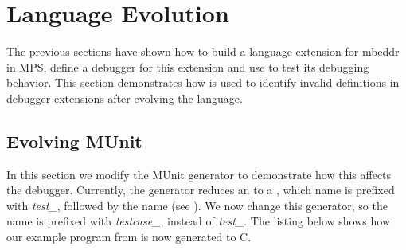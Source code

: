 \section{Language Evolution}

The previous sections have shown how to build a language extension for mbeddr in
\ac{MPS}, define a debugger for this extension and use  to test its
debugging behavior.
This section demonstrates how  is used to identify invalid definitions
in debugger extensions after evolving the language.

\subsection{Evolving MUnit}

In this section we modify the MUnit generator to demonstrate how this affects
the debugger. Currently, the generator reduces an  to a
, which name is prefixed with \emph{test\_}, 
followed by the  name (see ).
We now change this generator, so the  name is prefixed
with \emph{testcase\_}, instead of \emph{test\_}.
The listing below shows how our example program from  is
now generated to C.

